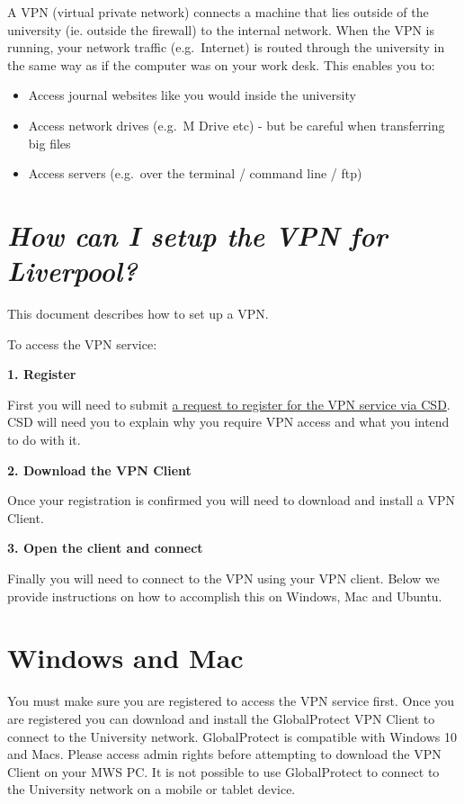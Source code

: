 \documentclass[
]{book}
\providecommand{\tightlist}{%
  \setlength{\itemsep}{0pt}\setlength{\parskip}{0pt}}
\begin{document}
A VPN (virtual private network) connects a machine that lies outside of the university (ie. outside the firewall) to the internal network. When the VPN is running, your network traffic (e.g.~Internet) is routed through the university in the same way as if the computer was on your work desk. This enables you to:

\begin{itemize}
\tightlist
\item
  Access journal websites like you would inside the university
\item
  Access network drives (e.g.~M Drive etc) - but be careful when transferring big files
\item
  Access servers (e.g.~over the terminal / command line / ftp)
\end{itemize}

\hypertarget{how-can-i-setup-the-vpn-for-liverpool}{%
\section{\texorpdfstring{\emph{How can I setup the VPN for Liverpool?}}{How can I setup the VPN for Liverpool?}}\label{how-can-i-setup-the-vpn-for-liverpool}}

This document describes how to set up a VPN.

To access the VPN service:

\textbf{1. Register}

First you will need to submit \href{https://liverpool.service-now.com/sp?id=sc_cat_item\&sys_id=bd8d37f1376ba60051a3532e53990e3f}{a request to register for the VPN service via CSD}. CSD will need you to explain why you require VPN access and what you intend to do with it.

\textbf{2. Download the VPN Client}

Once your registration is confirmed you will need to download and install a VPN Client.

\textbf{3. Open the client and connect}

Finally you will need to connect to the VPN using your VPN client. Below we provide instructions on how to accomplish this on Windows, Mac and Ubuntu.

\hypertarget{windows-and-mac}{%
\section{Windows and Mac}\label{windows-and-mac}}

You must make sure you are registered to access the VPN service first.
Once you are registered you can download and install the GlobalProtect VPN Client to connect to the University network.
GlobalProtect is compatible with Windows 10 and Macs.
Please access admin rights before attempting to download the VPN Client on your MWS PC.
It is not possible to use GlobalProtect to connect to the University network on a mobile or tablet device.
\end{document}
